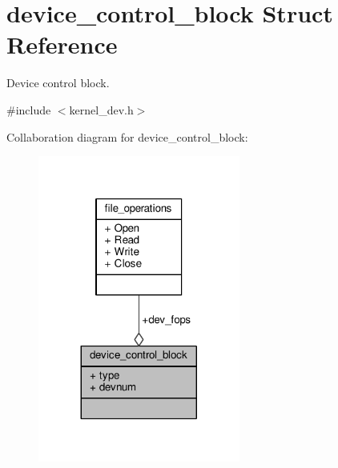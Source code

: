 \hypertarget{structdevice__control__block}{}\section{device\+\_\+control\+\_\+block Struct Reference}
\label{structdevice__control__block}


Device control block.  




{\ttfamily \#include $<$kernel\+\_\+dev.\+h$>$}



Collaboration diagram for device\+\_\+control\+\_\+block\+:
\nopagebreak
\begin{figure}[H]
\begin{center}
\leavevmode
\includegraphics[width=188pt]{structdevice__control__block__coll__graph}
\end{center}
\end{figure}
